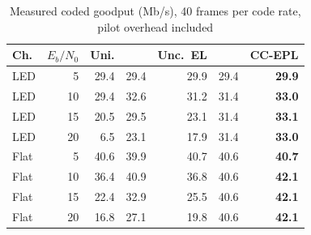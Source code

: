 \begin{table}[t]\centering\footnotesize
\caption{Measured coded goodput (Mb/s), 40 frames per code rate, pilot overhead included}\label{tab:coded}
\begin{tabular}{@{}lrrrrrr@{}}\toprule
Ch. & $E_b/N_0$ & Uni. & \cite{pham2026} & Unc.\ EL & \cite{ling2020} & CC-EPL \\\midrule
LED & 5 & 29.4 & 29.4 & 29.9 & 29.4 & \textbf{29.9} \\
LED & 10 & 29.4 & 32.6 & 31.2 & 31.4 & \textbf{33.0} \\
LED & 15 & 20.5 & 29.5 & 23.1 & 31.4 & \textbf{33.1} \\
LED & 20 & 6.5 & 23.1 & 17.9 & 31.4 & \textbf{33.0} \\
Flat & 5 & 40.6 & 39.9 & 40.7 & 40.6 & \textbf{40.7} \\
Flat & 10 & 36.4 & 40.9 & 36.8 & 40.6 & \textbf{42.1} \\
Flat & 15 & 22.4 & 32.9 & 25.5 & 40.6 & \textbf{42.1} \\
Flat & 20 & 16.8 & 27.1 & 19.8 & 40.6 & \textbf{42.1} \\
\bottomrule\end{tabular}\end{table}
